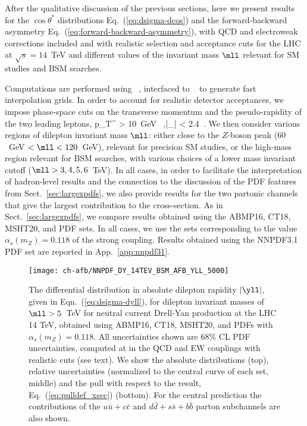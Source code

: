 
After the qualitative discussion of the previous sections, here we
present results for the $\cos\theta^*$
distributions Eq.~(\ref{eq:dsigma-dcos}) and the
forward-backward asymmetry Eq.~(\ref{eq:forward-backward-asymmetry}), with
\nlo QCD and electroweak corrections included and
with realistic selection and acceptance cuts for the LHC at $\sqrt{s} = 14$~TeV
and different values of the invariant mass $\mll$ relevant for SM
studies and BSM searches.

Computations are performed using \mgamc~\cite{Alwall:2014hca},
interfaced to \pineappl~\cite{Carrazza:2020gss,christopher_schwan_2022_7023438} to generate
fast interpolation grids.
%
In order to account for realistic detector acceptances,
we impose phase-space cuts on the transverse momentum and the pseudo-rapidity of the two
leading leptons,
\be
p_T^{\ell} > 10~{\rm GeV}  \, ,\qquad |\eta_{\ell}| < 2.4 \,.
\ee
We then consider various regions of dilepton invariant mass $\mll$:
either close to the $Z$-boson peak ($60$~GeV $< \mll < 120$~GeV),
relevant for precision SM studies, or the
high-mass region relevant for BSM searches, with  various choices of a
lower mass invariant cutoff ($\mll > 3,4,5,6$~TeV).
%
In all cases, in order to facilitate the interpretation of
hadron-level results  and the connection to
the discussion of the PDF features from Sect.~\ref{sec:largexpdfs},
we also provide results for the two partonic channels that give the
largest contribution to the cross-section.
%
As in Sect.~\ref{sec:largexpdfs}, we compare results obtained using
the  ABMP16, CT18, MSHT20, and  PDF sets.
%
In all cases, we
use the  \nnlo sets corresponding to the value $\alpha_s(m_Z)=0.118$
of the strong coupling.
%
Results obtained using the NNPDF3.1 PDF set are reported in App.~\ref{app:nnpdf31}.

\begin{figure}[!t]
 \centering
 \texttt{[image: ch-afb/NNPDF\_DY\_14TEV\_BSM\_AFB\_YLL\_5000]}
 \caption{The differential distribution in absolute dilepton rapidity $|\yll|$, given in
Eqn.~(\ref{eq:dsigma-dyll}),
for dilepton invariant masses of $\mll > 5$~TeV
for neutral current Drell-Yan production at the
LHC 14 TeV,
obtained using ABMP16, CT18, MSHT20, and  \nnlo PDFs with $\alpha_s(m_Z)=0.118$.
%
All
uncertainties shown are 68\% CL PDF uncertainties, computed at \nlo
in the QCD and EW couplings with realistic cuts (see text).
We show the absolute distributions (top), relative uncertainties (normalized
to the central curve of each set, middle) and the pull with respect to the
 result, Eq.~(\ref{eq:pulldef_xsec}) (bottom).
%
For the central  prediction
the contributions of the $u\bar{u}+c\bar{c}$ and $d\bar{d}+s\bar{s}+b\bar{b}$
parton subchannels are also shown.
 \label{fig:CMS_DY_14TEV_MLL_5000_rap}}
\end{figure}

